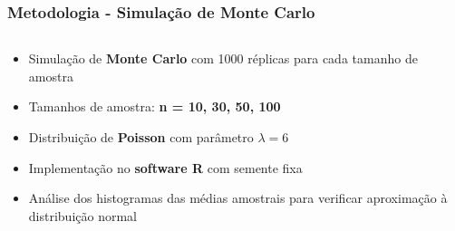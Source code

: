 \documentclass[aspectratio=169,12pt]{beamer}
\begin{document}
\begin{frame}
    \frametitle{Metodologia - Simulação de Monte Carlo}
    
    \begin{columns}
        \begin{column}{0.55\textwidth}
            \begin{itemize}
                \item[\faIcon{random}] Simulação de \textcolor{azulprincipal}{\textbf{Monte Carlo}} com 1000 réplicas para cada tamanho de amostra
                \vspace{0.3cm}
                
                \item[\faIcon{ruler}] Tamanhos de amostra: \textcolor{azulprincipal}{\textbf{n = 10, 30, 50, 100}}
                \vspace{0.3cm}
                
                \item[\faIcon{dice}] Distribuição de \textcolor{azulprincipal}{\textbf{Poisson}} com parâmetro $\lambda = 6$
                \vspace{0.3cm}
                
                \item[\faIcon{code}] Implementação no \textcolor{azulprincipal}{\textbf{software R}} com semente fixa
                \vspace{0.3cm}
                
                \item[\faIcon{chart-bar}] Análise dos histogramas das médias amostrais para verificar aproximação à distribuição normal
            \end{itemize}
        \end{column}
        

\end{columns}
\end{frame}
\end{document}
